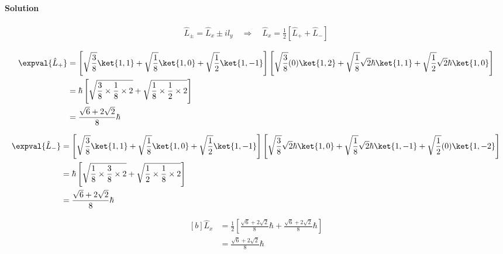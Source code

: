 \documentclass{article}
\begin{document}
\begin{enumerate}
		\paragraph{Solution}
		
		\begin{equation}
			\begin{split}
				\hat{L}_\pm = \hat{L}_x \pm i\hat{l}_y \quad \Rightarrow \quad \hat{L}_x = \frac{1}{2} \left[ \hat{L}_+ + \hat{L}_- \right]
			\end{split}
		\end{equation}
		
		\begin{equation}
			\begin{aligned}[b]
				\expval{\hat{L}_+} &= \left[ \sqrt{\frac{3}{8}} \ket{1,1} + \sqrt{\frac{1}{8}} \ket{1,0} + \sqrt{\frac{1}{2}} \ket{1,-1} \right] \left[ \sqrt{\frac{3}{8}} (0) \ket{1,2} + \sqrt{\frac{1}{8}} \sqrt{2}\hbar \ket{1,1} + \sqrt{\frac{1}{2}} \sqrt{2}\hbar \ket{1,0} \right] \\
								   &= \hbar \left[ \sqrt{\frac{3}{8} \times \frac{1}{8} \times 2} + \sqrt{\frac{1}{8} \times \frac{1}{2} \times 2} \right] \\
								   &= \frac{\sqrt{6} + 2\sqrt{2}}{8} \hbar
			\end{aligned}
		\end{equation}
		
		\begin{equation}
			\begin{aligned}[b]
				\expval{\hat{L}_-} &= \left[ \sqrt{\frac{3}{8}} \ket{1,1} + \sqrt{\frac{1}{8}} \ket{1,0} + \sqrt{\frac{1}{2}} \ket{1,-1} \right] \left[ \sqrt{\frac{3}{8}} \sqrt{2}\hbar \ket{1,0} + \sqrt{\frac{1}{8}} \sqrt{2}\hbar \ket{1,-1} + \sqrt{\frac{1}{2}} (0) \ket{1,-2} \right] \\
								   &= \hbar \left[ \sqrt{\frac{1}{8} \times \frac{3}{8} \times 2} + \sqrt{\frac{1}{2} \times \frac{1}{8} \times 2} \right] \\
								   &= \frac{\sqrt{6} + 2\sqrt{2}}{8} \hbar
			\end{aligned}
		\end{equation}
		
		\begin{equation}
			\begin{aligned}[b]
				\hat{L}_x &= \frac{1}{2} \left[ \frac{\sqrt{6} + 2\sqrt{2}}{8} \hbar + \frac{\sqrt{6} + 2\sqrt{2}}{8} \hbar \right] \\
						  &= \boxed{\frac{\sqrt{6} + 2\sqrt{2}}{8} \hbar} \\
			\end{aligned}
		\end{equation}
		

\end{enumerate}
\end{document}
